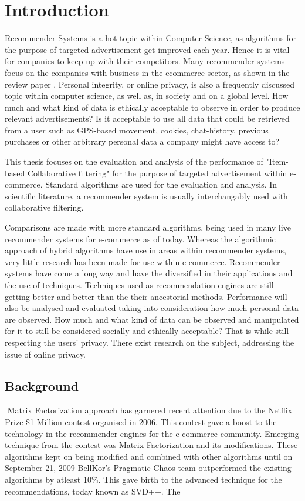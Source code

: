 \chapter{Introduction}
Recommender Systems is a hot topic within Computer Science, as algorithms for the purpose of targeted advertisement get improved each year. Hence it is vital for companies to keep up with their competitors. Many recommender systems focus on the companies with business in the ecommerce sector, as shown in the review paper \cite{Park2012}. Personal integrity, or online privacy, is also a frequently discussed topic within computer science, as well as, in society and on a global level. How much and what kind of data is ethically acceptable to observe in order to produce relevant advertisements? Is it acceptable to use all data that could be retrieved from a user such as GPS-based movement, cookies, chat-history, previous purchases or other arbitrary personal data a company might have access to?

This thesis focuses on the evaluation and analysis of the performance of "Item-based Collaborative filtering" for the purpose of targeted advertisement within e-commerce. Standard algorithms are used for the evaluation and analysis. In scientific literature, a recommender system is usually interchangably used with collaborative filtering.

Comparisons are made with more standard algorithms, being used in many live recommender systems for e-commerce as of today. Whereas the algorithmic approach of hybrid algorithms have use in areas within recommender systems, very little research has been made for use within e-commerce. Recommender systems have come a long way and have the diversified in their applications and the use of techniques. Techniques used as recommendation engines are still getting better and better than the their ancestorial methods. Performance will also be analysed and evaluated taking into consideration how much personal data are observed. How much and what kind of data can be observed and manipulated for it to still be considered socially and ethically acceptable? That is while still respecting the users’ privacy. There exist research‌​ on the subject, addressing the‌​ issue of online‌​ privacy. 

\section{Background}‌​‌​‌​‌​‌​‌​‌​‌​‌​‌​‌​‌​‌​‌​‌​‌​
Matrix Factorization approach has garnered recent attention due to the Netflix Prize \$1 Million contest organised in 2006. This contest gave a boost to the technology in the recommender engines for the e-commerce community. Emerging technique from the contest was Matrix Factorization and its modifications. These algorithms kept on being modified and combined with other algorithms until on September 21, 2009 BellKor's Pragmatic Chaos team outperformed the existing algorithms by atleast 10\%. This gave birth to the advanced technique for the recommendations, today known as SVD++. The 


